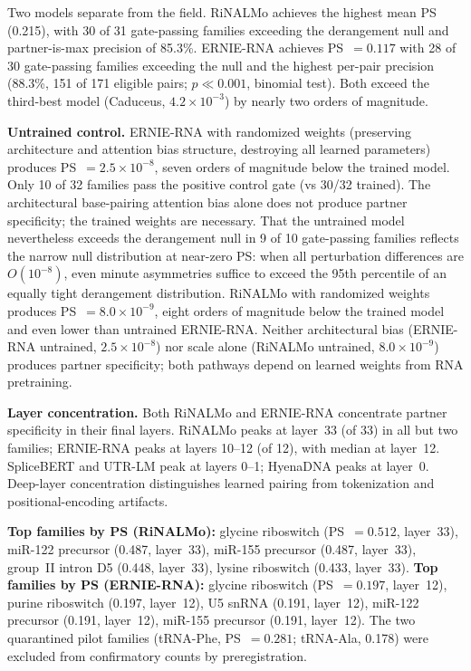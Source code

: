\documentclass[11pt]{article}
\begin{document}
Two models separate from the field.  RiNALMo achieves the highest
mean PS (0.215), with 30 of 31 gate-passing families exceeding the
derangement null and partner-is-max precision of 85.3\%.  ERNIE-RNA
achieves PS~$= 0.117$ with 28 of 30 gate-passing families exceeding
the null and the highest per-pair precision (88.3\%, 151 of 171
eligible pairs; $p \ll 0.001$, binomial test).  Both exceed the
third-best model (Caduceus, $4.2 \times 10^{-3}$) by nearly two
orders of magnitude.

\textbf{Untrained control.}
ERNIE-RNA with randomized weights (preserving architecture and
attention bias structure, destroying all learned parameters) produces
PS~$= 2.5 \times 10^{-8}$, seven orders of magnitude below the
trained model.  Only 10 of 32 families pass the positive control gate
(vs 30/32 trained).  The architectural base-pairing attention bias
alone does not produce partner specificity; the trained weights are
necessary.  That the untrained model nevertheless exceeds the
derangement null in 9 of 10 gate-passing families reflects the
narrow null distribution at near-zero PS: when all perturbation
differences are $O(10^{-8})$, even minute asymmetries suffice to
exceed the 95th percentile of an equally tight derangement
distribution.  RiNALMo with randomized weights produces
PS~$= 8.0 \times 10^{-9}$, eight orders of magnitude below the
trained model and even lower than untrained ERNIE-RNA.  Neither
architectural bias (ERNIE-RNA untrained, $2.5 \times 10^{-8}$) nor
scale alone (RiNALMo untrained, $8.0 \times 10^{-9}$) produces
partner specificity; both pathways depend on learned weights from
RNA pretraining.

\textbf{Layer concentration.}
Both RiNALMo and ERNIE-RNA concentrate partner specificity in their
final layers.  RiNALMo peaks at layer~33 (of 33) in all but two
families; ERNIE-RNA peaks at layers 10--12 (of 12), with median at
layer~12.  SpliceBERT and UTR-LM peak at layers 0--1; HyenaDNA peaks
at layer~0.  Deep-layer concentration distinguishes learned pairing
from tokenization and positional-encoding artifacts.

\textbf{Top families by PS (RiNALMo):}
glycine riboswitch (PS~$= 0.512$, layer~33),
miR-122 precursor (0.487, layer~33),
miR-155 precursor (0.487, layer~33),
group~II intron D5 (0.448, layer~33),
lysine riboswitch (0.433, layer~33).
\textbf{Top families by PS (ERNIE-RNA):}
glycine riboswitch (PS~$= 0.197$, layer~12),
purine riboswitch (0.197, layer~12),
U5 snRNA (0.191, layer~12),
miR-122 precursor (0.191, layer~12),
miR-155 precursor (0.191, layer~12).
The two quarantined pilot families (tRNA-Phe, PS~$= 0.281$;
tRNA-Ala, 0.178) were excluded from confirmatory counts by
preregistration.
\end{document}
